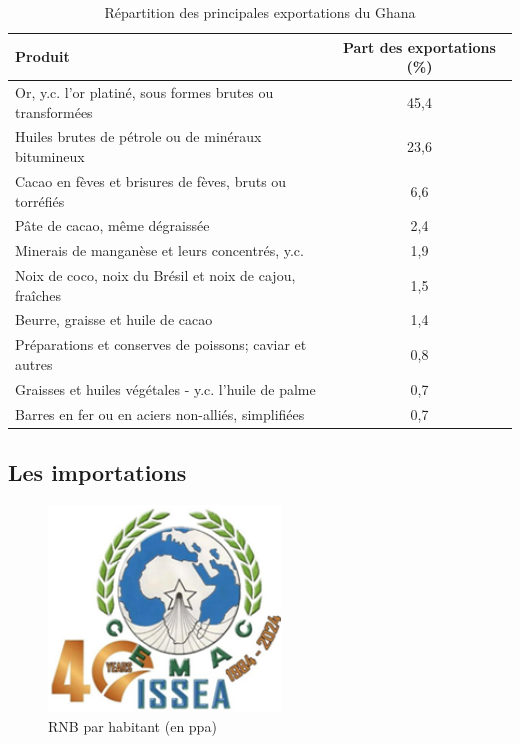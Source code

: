\begin{table}[H]	
	\captionsetup{justification=raggedright, singlelinecheck=false}
	\centering
	\caption{Répartition des principales exportations du Ghana}\vspace{-0.2cm}
	\fontsize{10}{20}\selectfont
	\begin{tabular}{||>{\raggedleft\arraybackslash}m{5.5cm}||c||}
		\hline
		\textbf{Produit} & \textbf{Part des exportations (\%)} \\
		\hline
		Or, y.c. l'or platiné, sous formes brutes ou transformées & 45,4 \\
		\hline
		Huiles brutes de pétrole ou de minéraux bitumineux & 23,6 \\
		\hline
		Cacao en fèves et brisures de fèves, bruts ou torréfiés & 6,6 \\
		\hline
		Pâte de cacao, même dégraissée & 2,4 \\
		\hline
		Minerais de manganèse et leurs concentrés, y.c. & 1,9 \\
		\hline
		Noix de coco, noix du Brésil et noix de cajou, fraîches & 1,5 \\
		\hline
		Beurre, graisse et huile de cacao & 1,4 \\
		\hline
		Préparations et conserves de poissons; caviar et autres & 0,8 \\
		\hline
		Graisses et huiles végétales - y.c. l'huile de palme & 0,7 \\
		\hline
		Barres en fer ou en aciers non-alliés, simplifiées & 0,7 \\
		\hline
	\end{tabular}
\end{table}
\vspace{-1.5cm}
\subsection{Les importations}
\begin{figure}[H]	
	\centering 
	\caption{ RNB par habitant (en ppa)}
	\includegraphics[width=0.55\textwidth, keepaspectratio]{Images/logo_issea.png}
\end{figure}

